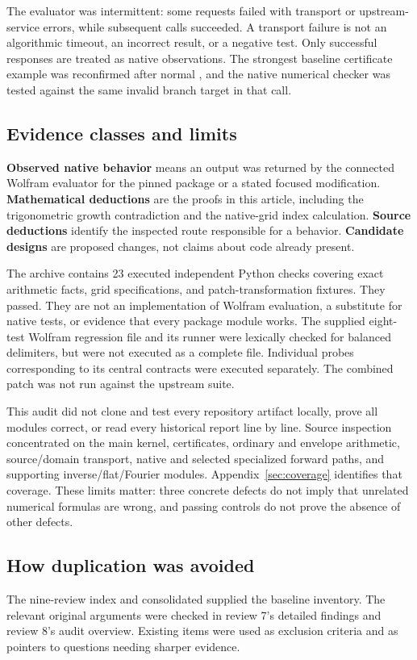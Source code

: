 \documentclass[11pt,a4paper]{article}
\newcommand{\code}[1]{\texttt{\detokenize{#1}}}
\begin{document}
The evaluator was intermittent: some requests failed with transport or upstream-service errors, while subsequent calls succeeded. A transport failure is not an algorithmic timeout, an incorrect result, or a negative test. Only successful responses are treated as native observations. The strongest baseline certificate example was reconfirmed after normal \code{Get[URLDownload[...]]}, and the native numerical checker was tested against the same invalid branch target in that call.

\subsection{Evidence classes and limits}
\textbf{Observed native behavior} means an output was returned by the connected Wolfram evaluator for the pinned package or a stated focused modification. \textbf{Mathematical deductions} are the proofs in this article, including the trigonometric growth contradiction and the native-grid index calculation. \textbf{Source deductions} identify the inspected route responsible for a behavior. \textbf{Candidate designs} are proposed changes, not claims about code already present.

The archive contains 23 executed independent Python checks covering exact arithmetic facts, grid specifications, and patch-transformation fixtures. They passed. They are not an implementation of Wolfram evaluation, a substitute for native tests, or evidence that every package module works. The supplied eight-test Wolfram regression file and its runner were lexically checked for balanced delimiters, but were not executed as a complete file. Individual probes corresponding to its central contracts were executed separately. The combined patch was not run against the upstream suite.

This audit did not clone and test every repository artifact locally, prove all modules correct, or read every historical report line by line. Source inspection concentrated on the main kernel, certificates, ordinary and envelope arithmetic, source/domain transport, native and selected specialized forward paths, and supporting inverse/flat/Fourier modules. Appendix~\ref{sec:coverage} identifies that coverage. These limits matter: three concrete defects do not imply that unrelated numerical formulas are wrong, and passing controls do not prove the absence of other defects.

\subsection{How duplication was avoided}
The nine-review index and consolidated \code{CODE_REVIEW_STATUS.md} supplied the baseline inventory. The relevant original arguments were checked in review 7's detailed findings and review 8's audit overview. Existing items were used as exclusion criteria and as pointers to questions needing sharper evidence.\cite{repo-reviews,repo-status,review7,review8}
\end{document}
